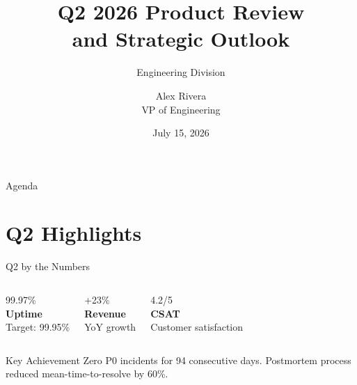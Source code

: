 \documentclass[
  doctype=beamer,
  beameraspectratio=169,
  beamertheme=Berlin,
  institution=generic,
]{omnilatex}
\title[Q2 2026 Review]{Q2 2026 Product Review\\and Strategic Outlook}
\subtitle{Engineering Division}
\author[A. Rivera]{Alex Rivera\\VP of Engineering}
\date{July 15, 2026}
\institute{OmniCorp}
\begin{document}
\begin{frame}[plain]
  \titlepage
\end{frame}

\begin{frame}{Agenda}
  \tableofcontents[hideallsubsections]
\end{frame}

\section{Q2 Highlights}

\begin{frame}{Q2 by the Numbers}
  \begin{columns}[T]
    \centering
    {\huge 99.97\%}\\[0.3em]
    \textbf{Uptime}\\[0.3em]
    {\small\color{gray}Target: 99.95\%}

    \centering
    {\huge +23\%}\\[0.3em]
    \textbf{Revenue}\\[0.3em]
    {\small\color{gray}YoY growth}

    \centering
    {\huge 4.2/5}\\[0.3em]
    \textbf{CSAT}\\[0.3em]
    {\small\color{gray}Customer satisfaction}
  \end{columns}

  \vspace{1em}
  \begin{exampleblock}{Key Achievement}
    Zero P0 incidents for 94 consecutive days. Postmortem process reduced mean-time-to-resolve by 60\%.
  \end{exampleblock}
\end{frame}
\end{document}
